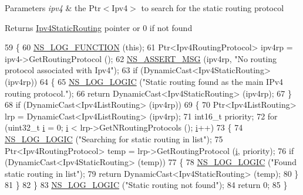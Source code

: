 \begin{DoxyParams}{Parameters}
{\em ipv4} & the Ptr$<$\+Ipv4$>$ to search for the static routing protocol \\
\hline
\end{DoxyParams}
\begin{DoxyReturn}{Returns}
\hyperlink{classns3_1_1Ipv4StaticRouting}{Ipv4\+Static\+Routing} pointer or 0 if not found 
\end{DoxyReturn}

\begin{DoxyCode}
59 \{
60   \hyperlink{log-macros-disabled_8h_a90b90d5bad1f39cb1b64923ea94c0761}{NS\_LOG\_FUNCTION} (\textcolor{keyword}{this});
61   Ptr<Ipv4RoutingProtocol> ipv4rp = ipv4->GetRoutingProtocol ();
62   \hyperlink{assert_8h_aff5ece9066c74e681e74999856f08539}{NS\_ASSERT\_MSG} (ipv4rp, \textcolor{stringliteral}{"No routing protocol associated with Ipv4"});
63   \textcolor{keywordflow}{if} (DynamicCast<Ipv4StaticRouting> (ipv4rp))
64     \{
65       \hyperlink{group__logging_ga88acd260151caf2db9c0fc84997f45ce}{NS\_LOG\_LOGIC} (\textcolor{stringliteral}{"Static routing found as the main IPv4 routing protocol."});
66       \textcolor{keywordflow}{return} DynamicCast<Ipv4StaticRouting> (ipv4rp); 
67     \} 
68   \textcolor{keywordflow}{if} (DynamicCast<Ipv4ListRouting> (ipv4rp))
69     \{
70       Ptr<Ipv4ListRouting> lrp = DynamicCast<Ipv4ListRouting> (ipv4rp);
71       int16\_t priority;
72       \textcolor{keywordflow}{for} (uint32\_t \hyperlink{bernuolliDistribution_8m_a6f6ccfcf58b31cb6412107d9d5281426}{i} = 0; \hyperlink{bernuolliDistribution_8m_a6f6ccfcf58b31cb6412107d9d5281426}{i} < lrp->GetNRoutingProtocols ();  \hyperlink{bernuolliDistribution_8m_a6f6ccfcf58b31cb6412107d9d5281426}{i}++)
73         \{
74           \hyperlink{group__logging_ga88acd260151caf2db9c0fc84997f45ce}{NS\_LOG\_LOGIC} (\textcolor{stringliteral}{"Searching for static routing in list"});
75           Ptr<Ipv4RoutingProtocol> temp = lrp->GetRoutingProtocol (\hyperlink{bernuolliDistribution_8m_a6f6ccfcf58b31cb6412107d9d5281426}{i}, priority);
76           \textcolor{keywordflow}{if} (DynamicCast<Ipv4StaticRouting> (temp))
77             \{
78               \hyperlink{group__logging_ga88acd260151caf2db9c0fc84997f45ce}{NS\_LOG\_LOGIC} (\textcolor{stringliteral}{"Found static routing in list"});
79               \textcolor{keywordflow}{return} DynamicCast<Ipv4StaticRouting> (temp);
80             \}
81         \}
82     \}
83   \hyperlink{group__logging_ga88acd260151caf2db9c0fc84997f45ce}{NS\_LOG\_LOGIC} (\textcolor{stringliteral}{"Static routing not found"});
84   \textcolor{keywordflow}{return} 0;
85 \}
\end{DoxyCode}


